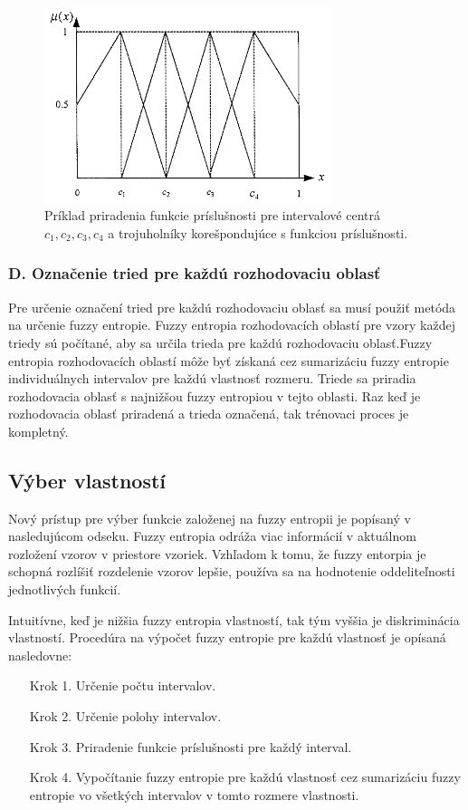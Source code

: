 \begin{figure}[h]
\includegraphics[width=0.75\textwidth]{obrazky/prikladFunkciePrislusnosti4}
\centering
\caption{Príklad priradenia funkcie príslušnosti pre intervalové centrá $c_1, c_2, c_3, c_4$ a trojuholníky korešpondujúce s funkciou príslušnosti. \cite{TODO}} 
\label{fig:prikladFunkciePrislusnosti}
\end{figure}

\subsubsection{D. Označenie tried pre každú rozhodovaciu oblasť}
Pre určenie označení tried pre každú rozhodovaciu oblasť sa musí použiť metóda na určenie fuzzy entropie. Fuzzy entropia rozhodovacích oblastí pre vzory každej triedy sú počítané, aby sa určila trieda pre každú rozhodovaciu oblasť.Fuzzy entropia rozhodovacích oblastí môže byť získaná cez sumarizáciu fuzzy entropie individuálnych intervalov pre každú vlastnosť rozmeru. Triede sa priradia rozhodovacia oblasť s najnižšou fuzzy entropiou v tejto oblasti.  Raz keď je rozhodovacia oblasť priradená a trieda označená, tak trénovaci proces je kompletný. 

\subsection{Výber vlastností}
Nový prístup pre výber funkcie založenej na fuzzy entropii je popísaný v nasledujúcom odseku. Fuzzy entropia odráža viac informácií v aktuálnom rozložení vzorov v priestore vzoriek. Vzhľadom k tomu, že fuzzy entorpia je schopná rozlíšiť rozdelenie vzorov lepšie, používa sa na hodnotenie oddeliteľnosti jednotlivých funkcií. 

Intuitívne, keď je nižšia fuzzy entropia vlastností, tak tým vyššia je diskriminácia vlastností. Procedúra na výpočet fuzzy entropie pre každú vlastnosť je opísaná nasledovne: 
\begin{itemize}
\item [Krok 1.] Určenie počtu intervalov. 
\item [Krok 2.] Určenie polohy intervalov. 
\item [Krok 3.] Priradenie funkcie príslušnosti pre každý interval. 
\item[Krok 4.] Vypočítanie fuzzy entropie pre každú vlastnosť cez sumarizáciu fuzzy entropie vo všetkých intervalov v tomto rozmere vlastnosti.  
\end{itemize}

